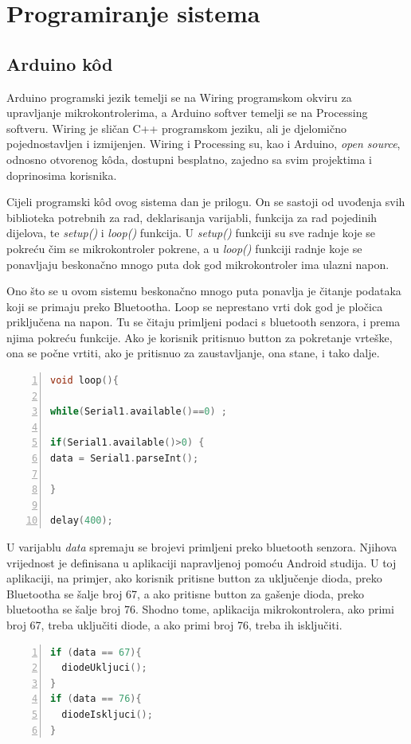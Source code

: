 \chapter{Programiranje sistema}

\section{Arduino kôd}
Arduino programski jezik temelji se na Wiring programskom okviru za upravljanje mikrokontrolerima, a Arduino softver temelji se na Processing softveru. Wiring je sličan C++ programskom jeziku, ali je djelomično pojednostavljen i izmijenjen. Wiring i Processing su, kao i Arduino, \textit{open source}, odnosno otvorenog kôda, dostupni besplatno, zajedno sa svim projektima i doprinosima korisnika.

Cijeli programski kôd ovog sistema dan je prilogu. On se sastoji od uvođenja svih biblioteka potrebnih za rad, deklarisanja varijabli, funkcija za rad pojedinih dijelova, te \textit{setup()} i \textit{loop()} funkcija. U \textit{setup()} funkciji su sve radnje koje se pokreću čim se mikrokontroler pokrene, a u \textit{loop()} funkciji radnje koje se ponavljaju beskonačno mnogo puta dok god mikrokontroler ima ulazni napon.  

Ono što se u ovom sistemu beskonačno mnogo puta ponavlja je čitanje podataka koji se primaju preko Bluetootha. 
Loop se neprestano vrti dok god je pločica priključena na napon. Tu se čitaju primljeni podaci s bluetooth senzora, i prema njima pokreću funkcije. Ako je korisnik pritisnuo button za pokretanje vrteške, ona se počne vrtiti, ako je pritisnuo za zaustavljanje, ona stane, i tako dalje.
 \begin{lstlisting}[frame=single,language=C++,numbers=left, numberstyle=\tiny, xleftmargin=0.05\textwidth, xrightmargin=0.05\textwidth, basicstyle=\ttfamily\footnotesize]
 void loop(){
 
while(Serial1.available()==0) ;

if(Serial1.available()>0) {
data = Serial1.parseInt();
 
} 

delay(400);

\end{lstlisting}

U varijablu \textit{data} spremaju se brojevi primljeni preko bluetooth senzora. Njihova vrijednost je definisana u aplikaciji napravljenoj pomoću Android studija. U toj aplikaciji, na primjer, ako korisnik pritisne button za uključenje dioda, preko Bluetootha se šalje broj 67, a ako pritisne button za gašenje dioda, preko bluetootha se šalje broj 76. Shodno tome, aplikacija mikrokontrolera, ako primi broj 67, treba uključiti diode, a ako primi broj 76, treba ih isključiti.
 \begin{lstlisting}[frame=single,language=C++,numbers=left, numberstyle=\tiny, xleftmargin=0.05\textwidth, xrightmargin=0.05\textwidth, basicstyle=\ttfamily\footnotesize]
 if (data == 67){
  diodeUkljuci();
}
if (data == 76){
  diodeIskljuci();
}

\end{lstlisting}

